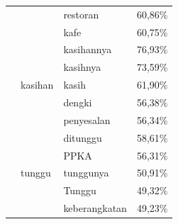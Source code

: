 \begin{longtable}[c]{|l|l|l|l|}
                                                                                                                           &                              & restoran                 & 60,86\%           \\ \cline{3-4}
                                                                                                                           &                              & kafe                     & 60,75\%           \\ \cline{2-4}
                                                                                                                           & \multirow[t]{5}{*}{kasihan}  & kasihannya               & 76,93\%           \\ \cline{3-4}
                                                                                                                           &                              & kasihnya                 & 73,59\%           \\ \cline{3-4}
                                                                                                                           &                              & kasih                    & 61,90\%           \\ \cline{3-4}
                                                                                                                           &                              & dengki                   & 56,38\%           \\ \cline{3-4}
                                                                                                                           &                              & penyesalan               & 56,34\%           \\ \cline{2-4}
                                                                                                                           & \multirow[t]{5}{*}{tunggu}   & ditunggu                 & 58,61\%           \\ \cline{3-4}
                                                                                                                           &                              & PPKA                     & 56,31\%           \\ \cline{3-4}
                                                                                                                           &                              & tunggunya                & 50,91\%           \\ \cline{3-4}
                                                                                                                           &                              & Tunggu                   & 49,32\%           \\ \cline{3-4}
                                                                                                                           &                              & keberangkatan            & 49,23\%           \\ \hline
\end{longtable}

